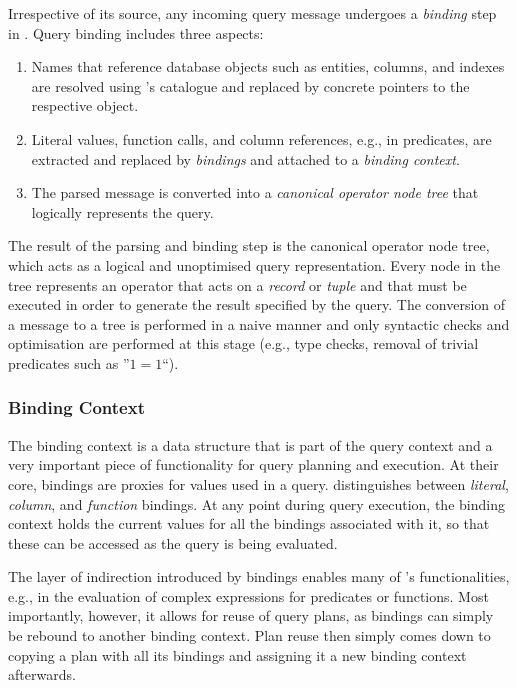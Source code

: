 Irrespective of its source, any incoming query message undergoes a \emph{binding} step in \cottontail{}. Query binding includes three aspects:

\begin{enumerate}
    \item Names that reference database objects such as entities, columns, and indexes are resolved using \cottontail{}'s catalogue and replaced by concrete pointers to the respective object.
    \item Literal values, function calls, and column references, e.g., in predicates, are extracted and replaced by \emph{bindings} and attached to a \emph{binding context}.
    \item The parsed message is converted into a \emph{canonical operator node tree} that logically represents the query.
\end{enumerate}

The result of the parsing and binding step is the canonical operator node tree, which acts as a logical and unoptimised query representation.  Every node in the tree represents an operator that acts on a \emph{record} or \emph{tuple} and that must be executed in order to generate the result specified by the query. The conversion of a message to a tree is performed in a naive manner and only syntactic checks and optimisation are performed at this stage (e.g., type checks, removal of trivial predicates such as ''$1 = 1$``).

\subsubsection{Binding Context}
The binding context is a data structure that is part of the query context and a very important piece of functionality for query planning and execution. At their core, bindings are proxies for values used in a query. \cottontail{} distinguishes between \emph{literal}, \emph{column}, and \emph{function} bindings. At any point during query execution, the binding context holds the current values for all the bindings associated with it, so that these can be accessed as the query is being evaluated.

The layer of indirection introduced by bindings enables many of \cottontail{}'s functionalities, e.g., in the evaluation of complex expressions for predicates or functions. Most importantly, however, it allows for reuse of query plans, as bindings can simply be rebound to another binding context. Plan reuse then simply comes down to copying a plan with all its bindings and assigning it a new binding context afterwards. 

